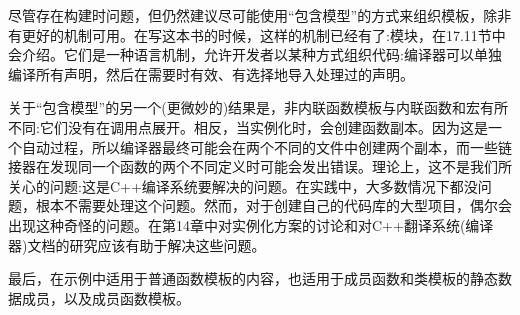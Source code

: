 尽管存在构建时问题，但仍然建议尽可能使用“包含模型”的方式来组织模板，除非有更好的机制可用。在写这本书的时候，这样的机制已经有了:模块，在17.11节中会介绍。它们是一种语言机制，允许开发者以某种方式组织代码:编译器可以单独编译所有声明，然后在需要时有效、有选择地导入处理过的声明。

关于“包含模型”的另一个(更微妙的)结果是，非内联函数模板与内联函数和宏有所不同:它们没有在调用点展开。相反，当实例化时，会创建函数副本。因为这是一个自动过程，所以编译器最终可能会在两个不同的文件中创建两个副本，而一些链接器在发现同一个函数的两个不同定义时可能会发出错误。理论上，这不是我们所关心的问题:这是C++编译系统要解决的问题。在实践中，大多数情况下都没问题，根本不需要处理这个问题。然而，对于创建自己的代码库的大型项目，偶尔会出现这种奇怪的问题。在第14章中对实例化方案的讨论和对C++翻译系统(编译器)文档的研究应该有助于解决这些问题。

最后，在示例中适用于普通函数模板的内容，也适用于成员函数和类模板的静态数据成员，以及成员函数模板。












